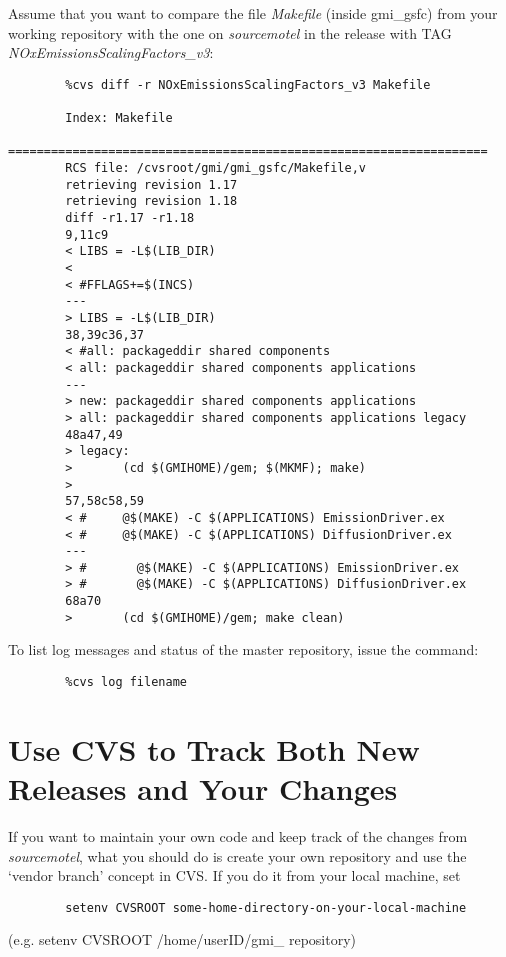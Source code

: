 \begin{example}
Assume that you want to compare the file {\em Makefile} (inside gmi\_gsfc) from your 
working repository with the one on {\em sourcemotel} in the release with TAG
{\em NOxEmissionsScalingFactors\_v3}:

\begin{verbatim}
        %cvs diff -r NOxEmissionsScalingFactors_v3 Makefile

        Index: Makefile
        ===================================================================
        RCS file: /cvsroot/gmi/gmi_gsfc/Makefile,v
        retrieving revision 1.17
        retrieving revision 1.18
        diff -r1.17 -r1.18
        9,11c9
        < LIBS = -L$(LIB_DIR) 
        < 
        < #FFLAGS+=$(INCS)
        ---
        > LIBS = -L$(LIB_DIR)
        38,39c36,37
        < #all: packageddir shared components
        < all: packageddir shared components applications
        ---
        > new: packageddir shared components applications
        > all: packageddir shared components applications legacy
        48a47,49
        > legacy:
        >       (cd $(GMIHOME)/gem; $(MKMF); make)
        > 
        57,58c58,59
        < #     @$(MAKE) -C $(APPLICATIONS) EmissionDriver.ex
        < #     @$(MAKE) -C $(APPLICATIONS) DiffusionDriver.ex
        ---
        > #       @$(MAKE) -C $(APPLICATIONS) EmissionDriver.ex
        > #       @$(MAKE) -C $(APPLICATIONS) DiffusionDriver.ex
        68a70
        >       (cd $(GMIHOME)/gem; make clean)
\end{verbatim}
\end{example}
%
To list log messages and status of the master repository, issue the command:
%
\begin{verbatim}
        %cvs log filename
\end{verbatim}

\section{Use CVS to Track Both New Releases and Your Changes}
%
If you want to maintain your own code and keep track of the changes
from {\em sourcemotel}, what you should do is create your own repository
and use the `vendor branch' concept in CVS.
If you do it from your local machine, set

\begin{verbatim}
        setenv CVSROOT some-home-directory-on-your-local-machine
\end{verbatim}
   (e.g. setenv CVSROOT /home/userID/gmi\_ repository)

